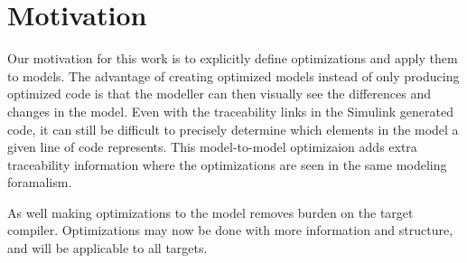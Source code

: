 \section{Motivation}
Our motivation for this work is to explicitly define optimizations and apply them to models. The advantage of creating optimized models instead of only producing optimized code is that the modeller can then visually see the differences and changes in the model. Even with the traceability links in the Simulink generated code, it can still be difficult to precisely determine which elements in the model a given line of code represents. This model-to-model optimizaion adds extra traceability information where the optimizations are seen in the same modeling foramalism.


As well making optimizations to the model removes burden on the target compiler. Optimizations may now be done with more information and structure, and will be applicable to all targets.
